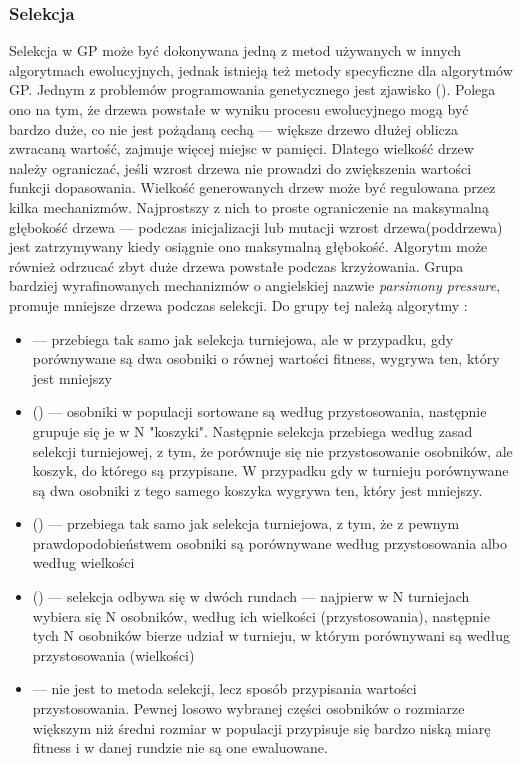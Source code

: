 \subsubsection{Selekcja}
Selekcja w GP może być dokonywana jedną z metod używanych w innych algorytmach ewolucyjnych, jednak istnieją też metody specyficzne dla algorytmów GP. Jednym z problemów programowania genetycznego jest zjawisko  (). Polega ono na tym, że drzewa powstałe w wyniku procesu ewolucyjnego mogą być bardzo duże, co nie jest pożądaną cechą --- większe drzewo dłużej oblicza zwracaną wartość, zajmuje więcej miejsc w pamięci. Dlatego wielkość drzew należy ograniczać, jeśli wzrost drzewa nie prowadzi do zwiększenia wartości funkcji dopasowania.
Wielkość generowanych drzew może być regulowana przez kilka mechanizmów. Najprostszy z nich to proste ograniczenie na maksymalną głębokość drzewa --- podczas inicjalizacji lub mutacji wzrost drzewa(poddrzewa) jest zatrzymywany kiedy osiągnie ono maksymalną głębokość. Algorytm może również odrzucać zbyt duże drzewa powstałe podczas krzyżowania.
Grupa bardziej wyrafinowanych mechanizmów o angielskiej nazwie \textit{parsimony pressure}, promuje mniejsze drzewa podczas selekcji. Do grupy tej należą algorytmy \cite{sean_ecj_2010}:
\begin{itemize}
	\item {} --- przebiega tak samo jak selekcja turniejowa, ale w przypadku, gdy porównywane są dwa osobniki o równej wartości fitness, wygrywa ten, który jest mniejszy
	\item {} () --- osobniki w populacji sortowane są według przystosowania, następnie grupuje się je w N "koszyki". Następnie selekcja przebiega według zasad selekcji turniejowej, z tym, że porównuje się nie przystosowanie osobników, ale koszyk, do którego są przypisane. W przypadku gdy w turnieju porównywane są dwa osobniki z tego samego koszyka wygrywa ten, który jest mniejszy.
	\item {} () --- przebiega tak samo jak selekcja turniejowa, z tym, że z pewnym prawdopodobieństwem osobniki są porównywane według przystosowania albo według wielkości
	\item {} () --- selekcja odbywa się w dwóch rundach --- najpierw w N turniejach wybiera się N osobników, według ich wielkości (przystosowania), następnie tych N osobników bierze udział w turnieju, w którym porównywani są według przystosowania (wielkości)
	\item {} --- nie jest to metoda selekcji, lecz sposób przypisania wartości przystosowania. Pewnej losowo wybranej części osobników o rozmiarze większym niż średni rozmiar w populacji przypisuje się bardzo niską miarę fitness i w danej rundzie nie są one ewaluowane.
\end{itemize}

